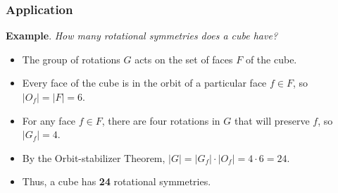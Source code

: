 \documentclass{beamer}
\begin{document}
\begin{frame}
\frametitle{Application}
	\textbf{Example}. \textit{How many rotational symmetries does a cube have?}
	
	\begin{itemize}
		\item The group of rotations $G$ acts on the set of faces $F$ of the cube.
		\item Every face of the cube is in the orbit of a particular face $f \in F$, so $|O_f|=|F|=6$.
		\item For any face $f \in F$, there are four rotations in $G$ that will preserve $f$, so $|G_f|=4$.
		\item By the Orbit-stabilizer Theorem, $|G|=|G_f| \cdot |O_f| = 4 \cdot 6 = 24$.
		\item Thus, a cube has \textbf{24} rotational symmetries.
	\end{itemize}
\end{frame}
\end{document}
